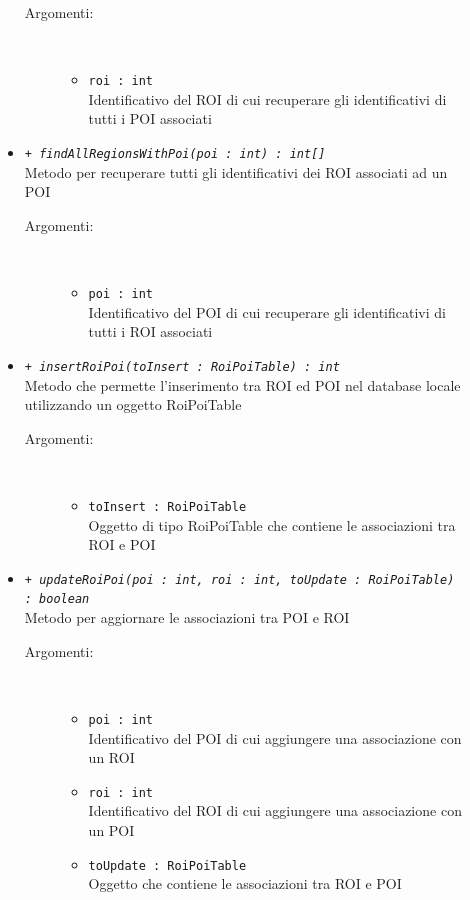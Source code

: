 \documentclass[../DefinizioneDiProdotto.tex]{subfiles}
\begin{document}
\begin{description}
\begin{itemize}
\begin{description}
			\item[Argomenti:] \
			\begin{itemize}
				\item \texttt{roi : int}\\
				Identificativo del ROI di cui recuperare gli identificativi di tutti i POI associati\end{itemize}
		\end{description}
		\item \texttt{+ \textit{findAllRegionsWithPoi(poi : int) : int[]}}\\
		Metodo per recuperare tutti gli identificativi dei ROI associati ad un POI 
		\begin{description}
			\item[Argomenti:] \
			\begin{itemize}
				\item \texttt{poi : int}\\
				Identificativo del POI di cui recuperare gli identificativi di tutti i ROI associati\end{itemize}
		\end{description}
		\item \texttt{+ \textit{insertRoiPoi(toInsert : RoiPoiTable) : int}}\\
		Metodo che permette l'inserimento tra ROI ed POI nel database locale utilizzando un oggetto RoiPoiTable
		\begin{description}
			\item[Argomenti:] \
			\begin{itemize}
				\item \texttt{toInsert : RoiPoiTable}\\
				Oggetto di tipo RoiPoiTable che contiene le associazioni tra ROI e POI\end{itemize}
		\end{description}
		\item \texttt{+ \textit{updateRoiPoi(poi : int, roi : int, toUpdate : RoiPoiTable) : boolean}}\\
		Metodo per aggiornare le associazioni tra POI e ROI
		\begin{description}
			\item[Argomenti:] \
			\begin{itemize}
				\item \texttt{poi : int}\\
				Identificativo del POI di cui aggiungere una associazione con un ROI\item \texttt{roi : int}\\
				Identificativo del ROI di cui aggiungere una associazione con un POI\item \texttt{toUpdate : RoiPoiTable}\\
				Oggetto che contiene le associazioni tra ROI e POI\end{itemize}
		\end{description}
	\end{itemize}
\end{description}
\end{document}
